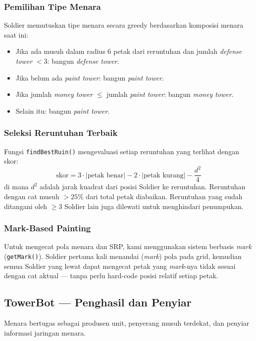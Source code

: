 \documentclass[12pt, a4paper]{article}
\begin{document}
\subsubsection*{Pemilihan Tipe Menara}

Soldier memutuskan tipe menara secara greedy berdasarkan komposisi menara saat ini:
\begin{itemize}
    \item Jika ada musuh dalam radius 6 petak dari reruntuhan dan jumlah
          \textit{defense tower} $< 3$: bangun \textit{defense tower}.
    \item Jika belum ada \textit{paint tower}: bangun \textit{paint tower}.
    \item Jika jumlah \textit{money tower} $\leq$ jumlah \textit{paint tower}: bangun
          \textit{money tower}.
    \item Selain itu: bangun \textit{paint tower}.
\end{itemize}

\subsubsection*{Seleksi Reruntuhan Terbaik}

Fungsi \texttt{findBestRuin()} mengevaluasi setiap reruntuhan yang terlihat dengan
skor:
\[
    \text{skor} = 3 \cdot |\text{petak benar}| - 2 \cdot |\text{petak kurang}| - \frac{d^2}{4}
\]
di mana $d^2$ adalah jarak kuadrat dari posisi Soldier ke reruntuhan. Reruntuhan
dengan cat musuh $> 25\%$ dari total petak diabaikan. Reruntuhan yang sudah
ditangani oleh $\geq 3$ Soldier lain juga dilewati untuk menghindari penumpukan.

\subsubsection*{Mark-Based Painting}

Untuk mengecat pola menara dan SRP, kami menggunakan sistem berbasis \textit{mark}
(\texttt{getMark()}). Soldier pertama kali menandai (\textit{mark}) pola pada grid,
kemudian semua Soldier yang lewat dapat mengecat petak yang \textit{mark}-nya tidak
sesuai dengan cat aktual --- tanpa perlu hard-code posisi relatif setiap petak.

\subsection{TowerBot --- Penghasil dan Penyiar}

Menara bertugas sebagai produsen unit, penyerang musuh terdekat, dan penyiar
informasi jaringan menara.
\end{document}
